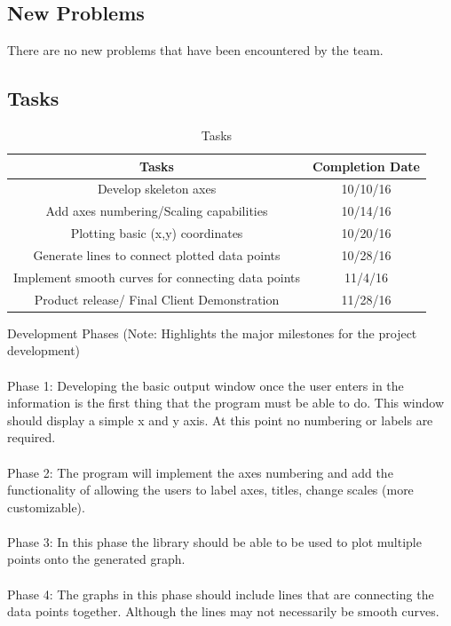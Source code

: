 \documentclass[12pt, titlepage]{article}
\begin{document}
\subsection{New Problems}
There are no new problems that have been encountered by the team.
\newpage
\subsection{Tasks} 
\begin{center}
\begin{table}[!hpb]
    \caption{Tasks} 
    \begin{tabular}{|c|c|}
	\hline
	Tasks & Completion Date \\ \hline
	Develop skeleton axes  & 10/10/16 \\ \hline
	Add axes numbering/Scaling capabilities & 10/14/16 \\ \hline
	Plotting basic (x,y) coordinates & 10/20/16 \\ \hline
	Generate lines to connect plotted data points & 10/28/16 \\ \hline
	Implement smooth curves for connecting data points & 11/4/16 \\ \hline
	Product release/ Final Client Demonstration  & 11/28/16 \\ \hline
    \end{tabular}
\end{table}
\end{center}
Development Phases (Note: Highlights the major milestones for the project development)\\ \\
Phase 1: Developing the basic output window once the user enters in the information is the first thing that the program must be able to do. This window should display a simple x and y axis. At this point no numbering or labels are required. \\ \\
Phase 2: The program will implement the axes numbering and add the functionality of allowing the users to label axes, titles, change scales (more customizable).\\ \\
Phase 3: In this phase the library should be able to be used to plot multiple points onto the generated graph.\\ \\
Phase 4: The graphs in this phase should include lines that are connecting the data points together. Although the lines may not necessarily be smooth curves.\\ \\
\end{document}
